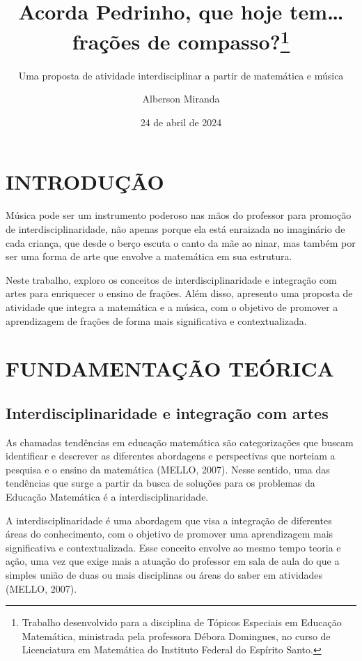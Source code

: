 \documentclass[
  letterpaper,
  DIV=11,
  numbers=noendperiod]{scrreprt}
\title{Acorda Pedrinho, que hoje tem\ldots{} frações de
compasso?\thanks{Trabalho desenvolvido para a disciplina de Tópicos
Especiais em Educação Matemática, ministrada pela professora Débora
Domingues, no curso de Licenciatura em Matemática do Instituto Federal
do Espírito Santo.}}
\subtitle{Uma proposta de atividade interdisciplinar a partir de
matemática e música}
\author{Alberson Miranda}
\date{24 de abril de 2024}
\renewcommand*\contentsname{Índice}
\newcommand\contentsname{Índice}
\begin{document}
\maketitle

\renewcommand*\contentsname{Índice}
{
\hypersetup{linkcolor=}
\setcounter{tocdepth}{2}
\tableofcontents
}
\chapter{INTRODUÇÃO}\label{introduuxe7uxe3o}

Música pode ser um instrumento poderoso nas mãos do professor para
promoção de interdisciplinaridade, não apenas porque ela está enraizada
no imaginário de cada criança, que desde o berço escuta o canto da mãe
ao ninar, mas também por ser uma forma de arte que envolve a matemática
em sua estrutura.

Neste trabalho, exploro os conceitos de interdisciplinaridade e
integração com artes para enriquecer o ensino de frações. Além disso,
apresento uma proposta de atividade que integra a matemática e a música,
com o objetivo de promover a aprendizagem de frações de forma mais
significativa e contextualizada.

\chapter{FUNDAMENTAÇÃO TEÓRICA}\label{fundamentauxe7uxe3o-teuxf3rica}

\section{Interdisciplinaridade e integração com
artes}\label{interdisciplinaridade-e-integrauxe7uxe3o-com-artes}

As chamadas tendências em educação matemática são categorizações que
buscam identificar e descrever as diferentes abordagens e perspectivas
que norteiam a pesquisa e o ensino da matemática (MELLO, 2007). Nesse
sentido, uma das tendências que surge a partir da busca de soluções para
os problemas da Educação Matemática é a interdisciplinaridade.

A interdisciplinaridade é uma abordagem que visa a integração de
diferentes áreas do conhecimento, com o objetivo de promover uma
aprendizagem mais significativa e contextualizada. Esse conceito envolve
ao mesmo tempo teoria e ação, uma vez que exige mais a atuação do
professor em sala de aula do que a simples união de duas ou mais
disciplinas ou áreas do saber em atividades (MELLO, 2007).
\end{document}
